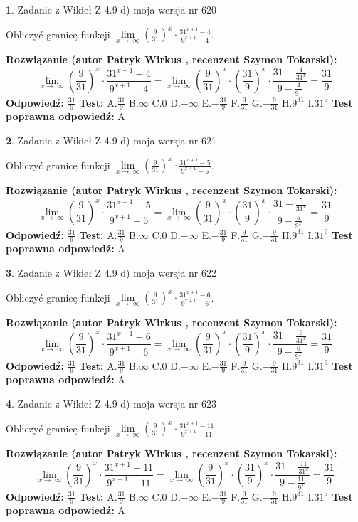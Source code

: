 \documentclass[12pt, a4paper]{article}
\theoremstyle{definition} %
\newtheorem{zad}{}
\newcommand{\zadStart}[1]{\begin{zad}#1\newline}
\newcommand{\zadStop}{\end{zad}}
\newcommand{\rozwStart}[2]{\noindent \textbf{Rozwiązanie (autor #1 , recenzent #2): }\newline}
\newcommand{\rozwStop}{\newline}
\newcommand{\odpStart}{\noindent \textbf{Odpowiedź:}\newline}
\newcommand{\odpStop}{\newline}
\newcommand{\testStart}{\noindent \textbf{Test:}\newline}
\newcommand{\testStop}{\newline}
\newcommand{\kluczStart}{\noindent \textbf{Test poprawna odpowiedź:}\newline}
\newcommand{\kluczStop}{\newline}
\begin{document}
\zadStart{Zadanie z Wikieł Z 4.9 d) moja wersja nr 620}


Obliczyć granicę funkcji  $\lim\limits_{x\to\ \infty}(\frac{9}{31})^{x}\cdot\frac{31^{x+1}-4}{9^{x+1}-4}$.
\zadStop
\rozwStart{Patryk Wirkus}{Szymon Tokarski}
$$\lim\limits_{x\to\ \infty}(\frac{9}{31})^{x}\cdot\frac{31^{x+1}-4}{9^{x+1}-4}=\lim\limits_{x\to\ \infty}(\frac{9}{31})^{x}\cdot(\frac{31}{9})^{x} \cdot \frac{31-\frac{4}{31^{x}}}{9-\frac{4}{9^{x}}} = \frac{31}{9}$$
\rozwStop
\odpStart
$\frac{31}{9}$
\odpStop
\testStart
A.$\frac{31}{9}$ B.$\infty$ C.$0$ D.$-\infty$ E.$-\frac{31}{9}$
F.$\frac{9}{31}$ G.$-\frac{9}{31}$
H.$9^{31}$
I.$31^{9}$
\testStop
\kluczStart
A
\kluczStop



\zadStart{Zadanie z Wikieł Z 4.9 d) moja wersja nr 621}


Obliczyć granicę funkcji  $\lim\limits_{x\to\ \infty}(\frac{9}{31})^{x}\cdot\frac{31^{x+1}-5}{9^{x+1}-5}$.
\zadStop
\rozwStart{Patryk Wirkus}{Szymon Tokarski}
$$\lim\limits_{x\to\ \infty}(\frac{9}{31})^{x}\cdot\frac{31^{x+1}-5}{9^{x+1}-5}=\lim\limits_{x\to\ \infty}(\frac{9}{31})^{x}\cdot(\frac{31}{9})^{x} \cdot \frac{31-\frac{5}{31^{x}}}{9-\frac{5}{9^{x}}} = \frac{31}{9}$$
\rozwStop
\odpStart
$\frac{31}{9}$
\odpStop
\testStart
A.$\frac{31}{9}$ B.$\infty$ C.$0$ D.$-\infty$ E.$-\frac{31}{9}$
F.$\frac{9}{31}$ G.$-\frac{9}{31}$
H.$9^{31}$
I.$31^{9}$
\testStop
\kluczStart
A
\kluczStop



\zadStart{Zadanie z Wikieł Z 4.9 d) moja wersja nr 622}


Obliczyć granicę funkcji  $\lim\limits_{x\to\ \infty}(\frac{9}{31})^{x}\cdot\frac{31^{x+1}-6}{9^{x+1}-6}$.
\zadStop
\rozwStart{Patryk Wirkus}{Szymon Tokarski}
$$\lim\limits_{x\to\ \infty}(\frac{9}{31})^{x}\cdot\frac{31^{x+1}-6}{9^{x+1}-6}=\lim\limits_{x\to\ \infty}(\frac{9}{31})^{x}\cdot(\frac{31}{9})^{x} \cdot \frac{31-\frac{6}{31^{x}}}{9-\frac{6}{9^{x}}} = \frac{31}{9}$$
\rozwStop
\odpStart
$\frac{31}{9}$
\odpStop
\testStart
A.$\frac{31}{9}$ B.$\infty$ C.$0$ D.$-\infty$ E.$-\frac{31}{9}$
F.$\frac{9}{31}$ G.$-\frac{9}{31}$
H.$9^{31}$
I.$31^{9}$
\testStop
\kluczStart
A
\kluczStop



\zadStart{Zadanie z Wikieł Z 4.9 d) moja wersja nr 623}


Obliczyć granicę funkcji  $\lim\limits_{x\to\ \infty}(\frac{9}{31})^{x}\cdot\frac{31^{x+1}-11}{9^{x+1}-11}$.
\zadStop
\rozwStart{Patryk Wirkus}{Szymon Tokarski}
$$\lim\limits_{x\to\ \infty}(\frac{9}{31})^{x}\cdot\frac{31^{x+1}-11}{9^{x+1}-11}=\lim\limits_{x\to\ \infty}(\frac{9}{31})^{x}\cdot(\frac{31}{9})^{x} \cdot \frac{31-\frac{11}{31^{x}}}{9-\frac{11}{9^{x}}} = \frac{31}{9}$$
\rozwStop
\odpStart
$\frac{31}{9}$
\odpStop
\testStart
A.$\frac{31}{9}$ B.$\infty$ C.$0$ D.$-\infty$ E.$-\frac{31}{9}$
F.$\frac{9}{31}$ G.$-\frac{9}{31}$
H.$9^{31}$
I.$31^{9}$
\testStop
\kluczStart
A
\kluczStop
\end{document}
